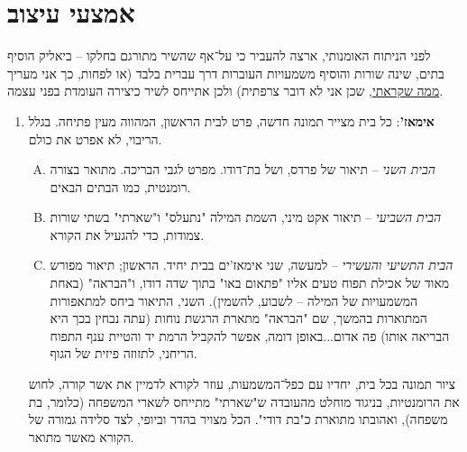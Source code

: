 \documentclass[]{article}
\begin{document}
	\section*{אמצעי עיצוב}
	לפני הניתוח האומנותי, ארצה להעביר כי על־אף שהשיר מתורגם בחלקו – ביאליק הוסיף בתים, שינה שורות והוסיף משמעויות העוברות דרך עברית בלבד (או לפחות, כך אני מעריך \href{https://www.zivashamir.com/post/%D7%A9%D7%99%D7%A8%D7%99-%D7%90%D7%94%D7%91%D7%94-%D7%91%D7%A9%D7%A4%D7%94-%D7%91%D7%9C%D7%95%D7%9C%D7%94}{ממה שקראתי}, שכן אני לא דובר צרפתית) ולכן אתייחס לשיר כיצירה העומדת בפני עצמה. 
	\begin{enumerate}
		\item \textbf{אימאז'}: כל בית מצייר תמונה חדשה, פרט לבית הראשון, המהווה מעין פתיחה. בגלל הריבוי, לא אפרט את כולם. 
		\begin{enumerate}[A. ]
			\item \textit{הבית השני} – תיאור של פרדס, ושל בת־דודו. מפרט לגבי הבריכה. מתואר בצורה רומנטית, כמו הבתים הבאים. 
			\item \textit{הבית השביעי} – תיאור אקט מיני, השמת המילה "נתעלס" ו"שארתי" בשתי שורות צמודות, כדי להגעיל את הקורא. 
			\item \textit{הבית התשיעי והעשירי} – למעשה, שני אימאז'ים בבית יחיד. הראשון; תיאור מפורש מאוד של אכילת תפוח טעים אליו "פתאום באו" בתוך שדה דודו, ו"הבראה" (באחת המשמעויות של המילה – לשבוע, להשמין). השני, התיאור ביחס למתאפורות המתוארות בהמשך, שם "הבראה" מתארת הרגשת נוחות (עתה  נבחין בכך היא הבריאה אותו) פה אדום...באופן דומה, אפשר להקביל הרמת יד והטיית ענף התפוח הריחני, לתזוזה פיזית של הגוף. 
		\end{enumerate}
		ציור תמונה בכל בית, יחדיו עם כפל־המשמעות, עוזר לקורא לדמיין את אשר קורה, לחוש את הרומנטיות, בניגוד מוחלט מהעובדה ש"שארתי" מתייחס לשארי המשפחה (כלומר, בת משפחה), ואהובתו מתוארת כ"בת דודי". הכל מצויר בהדר וביופי, לצד סלידה גמורה של הקורא מאשר מתואר. 
		

\end{enumerate}
\end{document}
